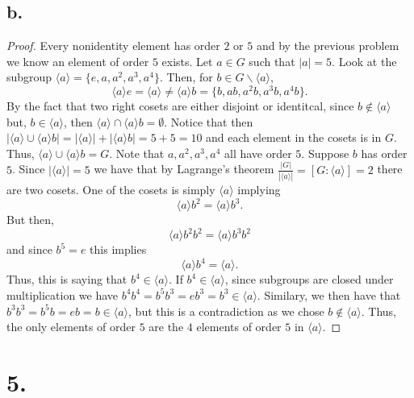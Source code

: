 \documentclass{article}
\begin{document}
\subsection*{b.}
\begin{proof}
    Every nonidentity element has order $2$ or $5$ and by the previous problem we know an element of order $5$ exists. Let $a \in G$ such that $|a| = 5$. Look at the subgroup $\langle a \rangle = \{e, a ,a^2, a^3, a^4\}$. Then, for $b \in G \backslash \langle a \rangle$, \[\langle a \rangle e = \langle a \rangle \neq \langle a \rangle b = \{b , ab, a^2b , a^3b, a^4b \}.\] 
    By the fact that two right cosets are either disjoint or identitcal, since $b \notin \langle a \rangle$ but, $b \in \langle a \rangle$, then $\langle a \rangle \cap \langle a \rangle b = \emptyset$. Notice that then $|\langle a \rangle \cup \langle a \rangle b| = |\langle a \rangle | + |\langle a \rangle b| = 5 + 5  =10$ and each element in the cosets is in $G$. Thus, $\langle a \rangle \cup \langle a \rangle b = G$. Note that $a, a^2, a^3, a^4$ all have order $5$. Suppose $b$ has order $5$. Since $|\langle a \rangle| = 5$ we have that by Lagrange's theorem $\frac{|G|}{|\langle a \rangle|} = [G: \langle a \rangle] = 2$ there are two cosets. One of the cosets is simply $\langle a \rangle$ implying \[
    \langle a \rangle b^2 = \langle a \rangle b^3.   
    \]
    But then,
\[
    \langle a \rangle b^2b^2 = \langle a \rangle b^3b^2
\]
and since $b^5 = e$ this implies
\[
 \langle a\rangle b^4 = \langle a \rangle.  
\]
Thus, this is saying that $b^4 \in \langle a \rangle$. If $b^4 \in \langle a \rangle$, since subgroups are closed under multiplication we have $b^4b^4 = b^5b^3 = eb^3 = b^3 \in \langle a \rangle$. Similary, we then have that $b^3b^3 = b^5 b = eb = b \in \langle a \rangle$, but this is a contradiction as we chose $b \notin \langle a \rangle$. Thus, the only elements of order $5$ are the $4$ elements of order $5$ in $\langle a \rangle$. 
\end{proof}


\section*{5.}
\end{document}
